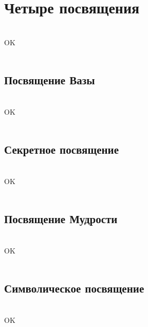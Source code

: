 \section{Четыре посвящения}
\\
\ti
\ru
OK\\
\\
\subsection{Посвящение Вазы}
\\
\ti
\ru
OK\\
\\
\subsection{Секретное посвящение}
\\
\ti
\ru
OK\\
\\
\subsection{Посвящение Мудрости}
\\
\ti
\ru
OK\\
\\
\subsection{Символическое посвящение}
\\
\ti
\ru
OK\\
\\

